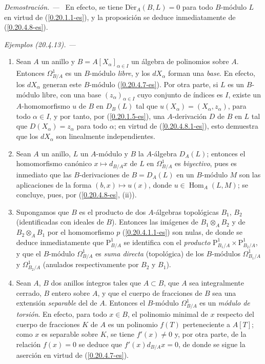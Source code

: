 \documentclass[10pt,oneside]{book}
\makeatletter
\newcommand{\sref}[1]{\textup{(\ref{#1})}}
\newcommand{\setmanualcurrentlabel}[1]{\def\@currentlabel{#1}}
\newenvironment{examples}[1][]{%
  \setmanualcurrentlabel{#1}\par\medskip\noindent\textit{Ejemplos (#1). ---}\ }{\par}
\newenvironment{proof}{%
  \par\medskip\noindent\textit{Demostración. ---\ }}{\par}
\makeatother
\begin{document}
\begin{proof}
En efecto, se tiene $\operatorname{D\acute{e}r}_A(B,L)=0$ para todo $B$-módulo
$L$ en virtud de \sref{0.20.1.1-es}, y la proposición se deduce inmediatamente
de \sref{0.20.4.8-es}.
\end{proof}

\begin{examples}[20.4.13]
\label{0.20.4.13-es}
\begin{enumerate}
  \item[\rm(i)] Sean $A$ un anillo y
  $B=A[X_\alpha]_{\alpha\in I}$ un álgebra de polinomios sobre $A$. Entonces
  $\Omega^1_{B/A}$ es un $B$-módulo \emph{libre}, y los $dX_\alpha$ forman una
  \emph{base}. En efecto, los $dX_\alpha$ generan este $B$-módulo
  \sref{0.20.4.7-es}. Por otra parte, si $L$ es un $B$-módulo libre, con
  una base $(z_\alpha)_{\alpha\in I}$ cuyo conjunto de índices es $I$, existe
  un $A$-homomorfismo $u$ de $B$ en $D_B(L)$ tal que
  $u(X_\alpha)=(X_\alpha,z_\alpha)$, para todo $\alpha\in I$, y por tanto, por
  \sref{0.20.1.5-es}, una $A$-derivación $D$ de $B$ en $L$ tal que
  $D(X_\alpha)=z_\alpha$ para todo $\alpha$; en virtud de
  \sref{0.20.4.8.1-es}, esto demuestra que los $dX_\alpha$ son linealmente
  independientes.
  \item[\rm(ii)] Sean $A$ un anillo, $L$ un $A$-módulo y $B$ la
  $A$-álgebra $D_A(L)$; entonces el homomorfismo canónico
  $x\mapsto d_{B/A}x$ de $L$ en $\Omega^1_{B/A}$ es \emph{biyectivo}, pues
  es inmediato que las $B$-derivaciones de $B=D_A(L)$ en un $B$-módulo
  $M$ son las aplicaciones de la forma $(b,x)\mapsto u(x)$, donde
  $u\in\operatorname{Hom}_A(L,M)$; se concluye, pues, por
  (\ref{0.20.4.8-es}, (ii)).
  \item[\rm(iii)] Supongamos que $B$ es el producto de dos $A$-álgebras
  topológicas $B_1$, $B_2$ (identificadas con ideales de $B$). Entonces las
  imágenes de $B_1\otimes_A B_2$ y de $B_2\otimes_A B_1$ por el homomorfismo
  $p$ \sref{0.20.4.1.1-es} son nulas, de donde se deduce inmediatamente que
  $\mathrm{P}^1_{B/A}$ se identifica con el \emph{producto}
  $\mathrm{P}^1_{B_1/A}\times\mathrm{P}^1_{B_2/A}$, y que el $B$-módulo
  $\Omega^1_{B/A}$ es \emph{suma directa} (topológica) de los $B$-módulos
  $\Omega^1_{B_1/A}$ y $\Omega^1_{B_2/A}$ (anulados respectivamente por
  $B_2$ y $B_1$).
  \item[\rm(iv)] Sean $A$, $B$ dos anillos íntegros tales que $A\subset
  B$, que $A$ sea integralmente cerrado, $B$ entero sobre $A$, y que el cuerpo
  de fracciones de $B$ sea una extensión \emph{separable} del de $A$. Entonces
  el $B$-módulo $\Omega^1_{B/A}$ es un \emph{módulo de torsión}. En efecto,
  para todo $x\in B$, el polinomio minimal de $x$ respecto del cuerpo de
  fracciones $K$ de $A$ es un polinomio $f(T)$ perteneciente a $A[T]$; como
  $x$ es separable sobre $K$, se tiene $f'(x)\neq0$ y, por otra parte, de
  la relación $f(x)=0$ se deduce que $f'(x)d_{B/A}x=0$, de donde se sigue
  la aserción en virtud de \sref{0.20.4.7-es}.
\end{enumerate}
\end{examples}
\end{document}

